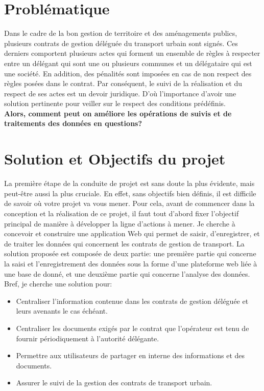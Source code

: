 \documentclass[a4paper]{report}
\begin{document}
\begin{doublespace}
    \section{Problématique}
    Dans le cadre de la bon gestion de territoire et des aménagements publics,
    plusieurs
    contrats de gestion déléguée du transport urbain sont signés. Ces derniers
    comportent
    plusieurs actes qui forment un ensemble de règles à respecter entre un
    délégant qui
    sont une ou plusieurs communes et un délégataire qui est une société. En
    addition,
    des pénalités sont imposées en cas de non respect des règles posées dans le
    contrat.
    Par conséquent, le suivi de la réalisation et du respect de ses actes est
    un devoir
    juridique. D’où l'importance d'avoir une solution pertinente pour veiller
    sur le
    respect des conditions prédéfinis.
    \\\textbf{Alors, comment peut on améliore les opérations de suivis et de
        traitements des données en questions?}
    \section{Solution et Objectifs du projet}
    La première étape de la conduite de projet est sans doute la plus évidente,
    mais peut-être
    aussi la plus cruciale. En effet, sans objectifs bien définis, il est
    difficile de savoir où votre projet
    va vous mener. Pour cela, avant de commencer dans la conception et la
    réalisation de ce projet,
    il faut tout d’abord fixer l’objectif principal de manière à développer la
    ligne d’actions à mener.
    Je cherche à concevoir et construire une application Web qui permet de
    saisir, d'enregistrer,
    et de traiter les données qui concernent les contrats de gestion de
    transport. La
    solution proposée est composée de deux partie: une première partie qui
    concerne la
    saisi et l'enregistrement des données sous la forme d'une plateforme web
    liée à une
    base de donné, et une deuxième partie qui concerne l'analyse des données.
    Bref, je cherche une solution pour:
    \begin{itemize}
        \item Centraliser l’information contenue dans les contrats de gestion
              déléguée et
              leurs avenants le cas échéant.
        \item Centraliser les documents exigés par le contrat que l’opérateur
              est tenu de
              fournir périodiquement à l’autorité délégante.
        \item Permettre aux utilisateurs de partager en interne des
              informations et des
              documents.
        \item Assurer le suivi de la gestion des contrats de transport urbain.
    \end{itemize}
    \newpage

\end{doublespace}
\end{document}
